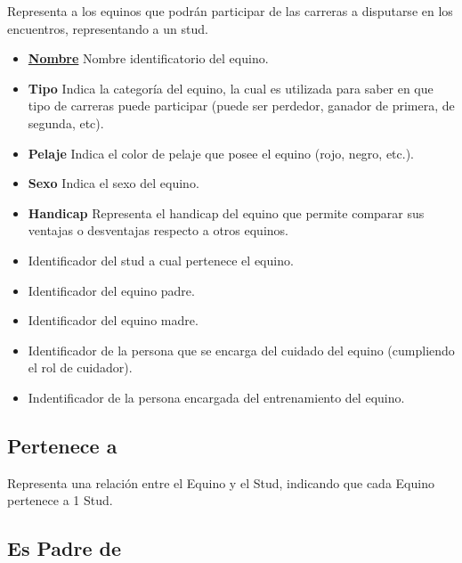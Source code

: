 \documentclass[a4paper,11pt]{article}
\begin{document}
Representa a los equinos que podrán participar de las carreras a disputarse en
los encuentros, representando a un stud.

\begin{itemize}

  \item \textbf{\uline{Nombre}} Nombre identificatorio del equino.
    
  \item \textbf{Tipo} Indica la categoría del equino, la cual es utilizada
	para saber en que tipo de carreras puede participar (puede ser perdedor, 
	ganador de primera, de segunda, etc). 
  
  \item \textbf{Pelaje} Indica el color de pelaje que posee el equino (rojo, 
	negro, etc.).
  
  \item \textbf{Sexo} Indica el sexo del equino.
  
  \item \textbf{Handicap} Representa el handicap del equino que permite comparar
	sus ventajas o desventajas respecto a otros equinos.
   
  \item \textbf{} Identificador del stud a cual pertenece el equino.
  
  \item \textbf{} Identificador del equino padre.
  
  \item \textbf{} Identificador del equino madre.
  
  \item \textbf{} Identificador de la persona que se encarga 
	del cuidado del equino (cumpliendo el rol de cuidador).
  
  \item \textbf{} Indentificador de la persona encargada 
	del entrenamiento del equino.
  
\end{itemize}

\subsection{Pertenece a}

Representa una relación entre el Equino y el Stud, indicando que cada Equino pertenece a 
1 Stud.

\subsection{Es Padre de}
\end{document}
